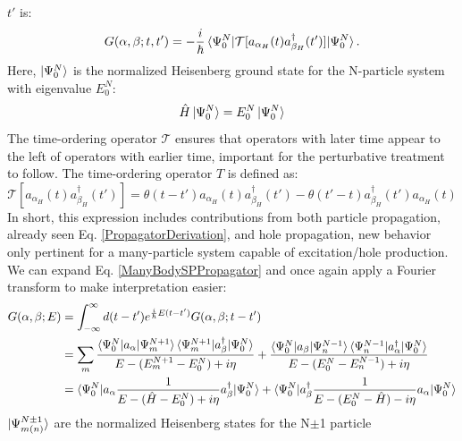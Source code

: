 $t'$ is:
\begin{equation} \label{ManyBodySPPropagator}
    G(\alpha, \beta; t, t') =
    -\frac{i}{\hbar}\braket{\Psi^{N}_{0}|\mathcal{T}
    [a_{\alpha_{H}}(t)a^{\dagger}_{\beta_{H}}(t')]|\Psi^{N}_{0}}.
\end{equation}
Here, $\ket{\Psi^{N}_{0}}$ is the normalized Heisenberg ground state for the N-particle system with
eigenvalue $E^{N}_{0}$:
\begin{equation} \label{NParticleGroundState}
    \hat{H}\ket{\Psi^{N}_{0}} = E^{N}_{0}\ket{\Psi^{N}_{0}}
\end{equation}
The time-ordering operator $\mathcal{T}$ ensures
that operators with later time appear to the left
of operators with earlier time\footnotemark, important for the perturbative treatment to follow.
\footnotetext
{
    The time-ordering operator $T$ is defined as:
    \begin{equation*}
        \mathcal{T}[a_{\alpha_{H}}(t)a^{\dagger}_{\beta_{H}}(t')]=\theta(t-t')a_{\alpha_{H}}(t)a^{\dagger}_{\beta_{H}}(t')
        -\theta(t'-t)a^{\dagger}_{\beta_{H}}(t')a_{\alpha_{H}}(t)
    \end{equation*}
}
In short, this expression includes contributions from both particle propagation, already seen 
Eq. \ref{PropagatorDerivation}, and hole propagation, new behavior only
pertinent for a many-particle system capable of excitation/hole production. We can expand Eq.
\ref{ManyBodySPPropagator} and once again apply a Fourier transform to make
interpretation easier:
\begin{equation} \label{LehmannRepresentation}
    \begin{split}
        G(\alpha,\beta;E) & =
        \int_{-\infty}^{\infty}d(t-t')e^{\frac{i}{\hbar}E(t-t')}G(\alpha,\beta;t-t')\\
        & = \sum_m
        \frac{\braket{\Psi^{N}_{0}|a_{\alpha}|\Psi^{N+1}_{m}}\braket{\Psi^{N+1}_{m}|a^{\dagger}_{\beta}|\Psi^{N}_{0}}}
        {E-(E^{N+1}_{m}-E^{N}_{0})+i\eta} +
        \frac{\braket{\Psi^{N}_{0}|a_{\beta}|\Psi^{N-1}_{n}}\braket{\Psi^{N-1}_{n}|a^{\dagger}_{\alpha}|\Psi^{N}_{0}}}
        {E-(E^{N}_{0}-E^{N-1}_{n})+i\eta}\\
        & =
        \braket{\Psi^{N}_{0}|a_{\alpha}\frac{1}{E-(\hat{H}-E_{0}^{N})+i\eta}a^{\dagger}_{\beta}|\Psi^{N}_{0}} +
        \braket{\Psi^{N}_{0}|a^{\dagger}_{\beta}\frac{1}{E-(E^{N}_{0}-\hat{H})-i\eta}a_{\alpha}|\Psi^{N}_{0}}
    \end{split}
\end{equation}
$\ket{\Psi^{N\pm1}_{m(n)}}$ are the normalized Heisenberg states for the N$\pm$1 particle 
